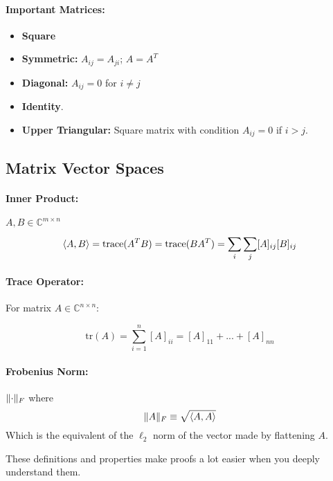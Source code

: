 \documentclass[a4paper,12pt]{report}
\DeclarePairedDelimiter\norm{\lVert}{\rVert}%
\DeclarePairedDelimiter\inpr{\langle}{\rangle}%
\begin{document}
\paragraph{Important Matrices: } 
\begin{itemize}
\item \textbf{Square}
\item \textbf{Symmetric: } $A_{ij} = A_{ji}$; $A = A^T$
\item \textbf{Diagonal: } $A_{ij} = 0$ for $i \neq j$
\item \textbf{Identity}.
\item \textbf{Upper Triangular:} Square matrix with condition $A_{ij} = 0$ if $i > j$.
\end{itemize}

\subsection{Matrix Vector Spaces}

\paragraph{Inner Product: } $A, B \in \mathbb{C}^{m\times n}$ 
\begin{equation}
	\inpr{A, B} = \text{trace}(A^T B) = \text{trace}(BA^T) = \sum_{i}^{} \sum_{j}^{} [A]_{ij} [B]_{ij}
\end{equation}

\paragraph{Trace Operator: } For matrix $A\in \mathbb{C}^{n\times n}$:

\begin{equation}
		\text{tr}(A) = \sum_{i=1}^{n} [A]_{ii} = [A]_{11} + ... + [A]_{nn}
\end{equation}

\paragraph{Frobenius Norm: } $\norm{\cdot}_F$ where
\begin{equation}
\norm{A}_F \equiv \sqrt{\inpr{A,A}}
\end{equation}
Which is the equivalent of the $\ell_2$ norm of the vector made by flattening $A$.


These definitions and properties make proofs a lot easier when you deeply understand them. 
\end{document}
